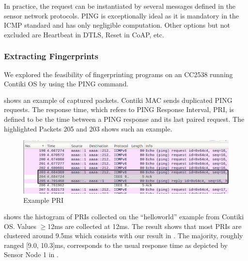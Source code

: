 \documentclass{article}
\begin{document}
In practice, the request can be instantiated by several messages defined in the sensor network protocols. PING is exceptionally ideal as it is mandatory in the ICMP standard\cite{rfc4433} and has only negligible computation. Other options but not excluded are Heartbeat in DTLS\cite{rfc6520}, Reset in CoAP\cite{rfc7252}, etc.

\subsubsection{Extracting Fingerprints}
We explored the feasibility of fingerprinting programs on an CC2538 running Contiki OS by using the PING command.

 shows an example of captured packets. Contiki MAC\cite{ContikiMAC} sends duplicated PING requests. The response time, which refers to PING Response Interval, PRI, is defined to be the time between a PING response and its last paired request. The highlighted Packets 205 and 203 shows such an example.

\begin{figure}[!h]
	\centering
	\includegraphics[width=\textwidth]{fig/PRI_hl.png}
	\caption{Example PRI\label{ExamplePri}}
\end{figure}


 shows the histogram of PRIs collected on the ``helloworld'' example from Contiki OS. Values $\geq$12ms are collected at 12ms. The result shows that most PRIs are clustered around 9.5ms which consists with our result in . The majority, roughly ranged [9.0, 10.3]ms, corresponds to the usual response time as depicted by Sensor Node 1 in . 
\end{document}
